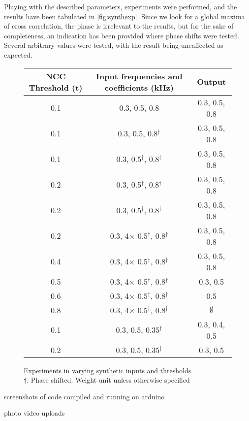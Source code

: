 Playing with the described parameters, experiments were performed, and the
results have been tabulated in \autoref{fig:synthexp}. Since we look for a
global maxima of cross correlation, the phase is irrelevant to the results, but
for the sake of completeness, an indication has been provided where phase shifts
were tested. Several arbitrary values were tested, with the result being
uneaffected as expected.

\begin{figure}[ht]
    \centering
    \def\arraystretch{1.5}
    \setlength\tabcolsep{2em}
    \begin{tabular}{c | c | c}
        NCC Threshold (t)   & Input frequencies and coefficients (kHz)      & Output \\ \hline
        0.1                 & 0.3, 0.5, 0.8                                 & 0.3, 0.5, 0.8 \\
        0.1                 & 0.3, 0.5, 0.8$^\dagger$                       & 0.3, 0.5, 0.8 \\
        0.1                 & 0.3, 0.5$^\dagger$, 0.8$^\dagger$             & 0.3, 0.5, 0.8 \\
        0.2                 & 0.3, 0.5$^\dagger$, 0.8$^\dagger$             & 0.3, 0.5, 0.8 \\
        0.2                 & 0.3, 0.5$^\dagger$, 0.8$^\dagger$             & 0.3, 0.5, 0.8 \\
        0.2                 & 0.3, 4$\times$ 0.5$^\dagger$, 0.8$^\dagger$   & 0.3, 0.5, 0.8 \\
        0.4                 & 0.3, 4$\times$ 0.5$^\dagger$, 0.8$^\dagger$   & 0.3, 0.5, 0.8 \\
        0.5                 & 0.3, 4$\times$ 0.5$^\dagger$, 0.8$^\dagger$   & 0.3, 0.5      \\
        0.6                 & 0.3, 4$\times$ 0.5$^\dagger$, 0.8$^\dagger$   & 0.5           \\
        0.8                 & 0.3, 4$\times$ 0.5$^\dagger$, 0.8$^\dagger$   & $\emptyset$   \\
        0.1                 & 0.3, 0.5, 0.35$^\dagger$                      & 0.3, 0.4, 0.5 \\
        0.2                 & 0.3, 0.5, 0.35$^\dagger$                      & 0.3, 0.5     
    \end{tabular}
    \captionsetup{justification=centering}
    \caption{Experiments in varying synthetic inputs and thresholds.\\
    $\dagger.$ Phase shifted. Weight unit unless otherwise specified}
    \label{fig:synthexp}

\end{figure}

screenshots of code compiled and running on arduino

photo video uploads